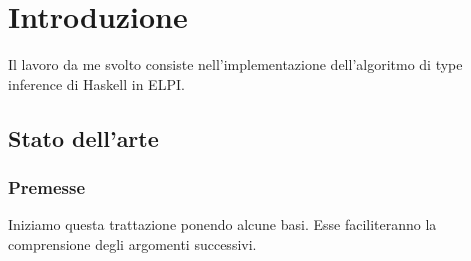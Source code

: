 \documentclass[12pt,a4paper,openright,twoside]{report}
\begin{document}


\tableofcontents	%

\rhead[\fancyplain{}{\bfseries\leftmark}]{\fancyplain{}{\bfseries\thepage}}

\clearpage{\pagestyle{empty}\cleardoublepage}	%








\chapter{Introduzione}		%


Il lavoro da me svolto consiste nell'implementazione dell'algoritmo di type inference di Haskell in ELPI.\\

\section{Stato dell'arte}

\subsection{Premesse}
Iniziamo questa trattazione ponendo alcune basi. Esse faciliteranno la comprensione degli argomenti successivi.\\
\end{document}
